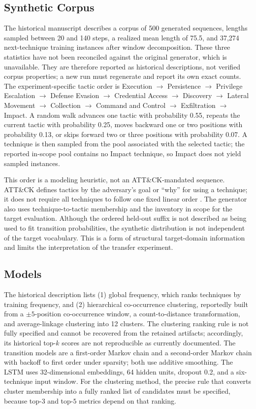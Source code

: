 \documentclass[conference]{IEEEtran}
\begin{document}
\subsection{Synthetic Corpus}
The historical manuscript describes a corpus of 500 generated sequences, lengths sampled between 20 and 140 steps, a realized mean length of 75.5, and 37,274 next-technique training instances after window decomposition. These three statistics have not been reconciled against the original generator, which is unavailable. They are therefore reported as historical descriptions, not verified corpus properties; a new run must regenerate and report its own exact counts. The experiment-specific tactic order is Execution $\rightarrow$ Persistence $\rightarrow$ Privilege Escalation $\rightarrow$ Defense Evasion $\rightarrow$ Credential Access $\rightarrow$ Discovery $\rightarrow$ Lateral Movement $\rightarrow$ Collection $\rightarrow$ Command and Control $\rightarrow$ Exfiltration $\rightarrow$ Impact. A random walk advances one tactic with probability 0.55, repeats the current tactic with probability 0.25, moves backward one or two positions with probability 0.13, or skips forward two or three positions with probability 0.07. A technique is then sampled from the pool associated with the selected tactic; the reported in-scope pool contains no Impact technique, so Impact does not yield sampled instances.

This order is a modeling heuristic, not an ATT\&CK-mandated sequence. ATT\&CK defines tactics by the adversary's goal or ``why'' for using a technique; it does not require all techniques to follow one fixed linear order \cite{mitreTactics}. The generator also uses technique-to-tactic membership and the inventory in scope for the target evaluation. Although the ordered held-out suffix is not described as being used to fit transition probabilities, the synthetic distribution is not independent of the target vocabulary. This is a form of structural target-domain information and limits the interpretation of the transfer experiment.

\subsection{Models}
The historical description lists (1) global frequency, which ranks techniques by training frequency, and (2) hierarchical co-occurrence clustering, reportedly built from a $\pm5$-position co-occurrence window, a count-to-distance transformation, and average-linkage clustering into 12 clusters. The clustering ranking rule is not fully specified and cannot be recovered from the retained artifacts; accordingly, its historical top-$k$ scores are not reproducible as currently documented. The transition models are a first-order Markov chain and a second-order Markov chain with backoff to first order under sparsity; both use additive smoothing. The LSTM uses 32-dimensional embeddings, 64 hidden units, dropout 0.2, and a six-technique input window. For the clustering method, the precise rule that converts cluster membership into a fully ranked list of candidates must be specified, because top-$3$ and top-$5$ metrics depend on that ranking.
\end{document}

